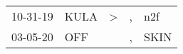 \begin{supertabular}{p{0.07\textwidth}p{0.06\textwidth}p{0.02\textwidth}p{0.02\textwidth}p{0.06\textwidth}}
 10-31-19\textsuperscript{} &  KULA\textsuperscript{} &  \textgreater &  , &   n2f\textsuperscript{} \\
 03-05-20\textsuperscript{} &   OFF\textsuperscript{} &               &  , &  SKIN\textsuperscript{} \\
\end{supertabular}
